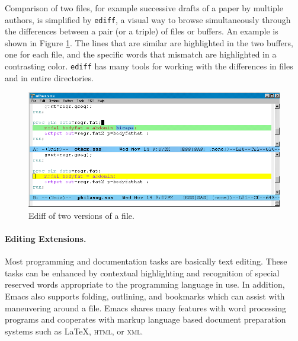 \documentclass{article}
\newif\ifdraft
\newcommand{\stexttt}[1]{{\small\texttt{#1}}}
\newcommand{\emptyfig}{
\hspace*{42pt}\rule{324pt}{.25pt}\\
\hspace*{42pt}\rule{.25pt}{10pc}
\rule{316pt}{.25pt}
\rule{.25pt}{10pc}}
\begin{document}
Comparison of two files, for example successive drafts of a paper
by multiple authors, is simplified by \stexttt{ediff}, a visual 
way to browse simultaneously through
the differences between a pair (or a triple) of files or buffers.
An example is shown in Figure \ref{f.ediff}.  The lines that are similar
are highlighted in the two buffers, one for each file, and the specific
words that mismatch are highlighted in a contrasting color.
\stexttt{ediff} has many tools for working with the differences in
files and in entire directories.


\begin{figure}[htbp] 
 \centering
\ifdraft
  \emptyfig
\else
  \includegraphics[angle=270,width=\textwidth]{ediff-sas}
\fi
  \caption{Ediff of two versions of a file.}
  \label{f.ediff}
\end{figure}

\paragraph{Editing Extensions.}
Most programming and documentation tasks are basically text editing.
These tasks can be enhanced by %
contextual highlighting and recognition of special reserved words
appropriate to the programming language in use.  In addition, Emacs
also supports folding, outlining, and bookmarks which can assist with
maneuvering around a file.  Emacs shares many features with word
processing programs and cooperates with markup language based document
preparation systems such as \LaTeX, \textsc{html}, or \textsc{xml}.
\end{document}
